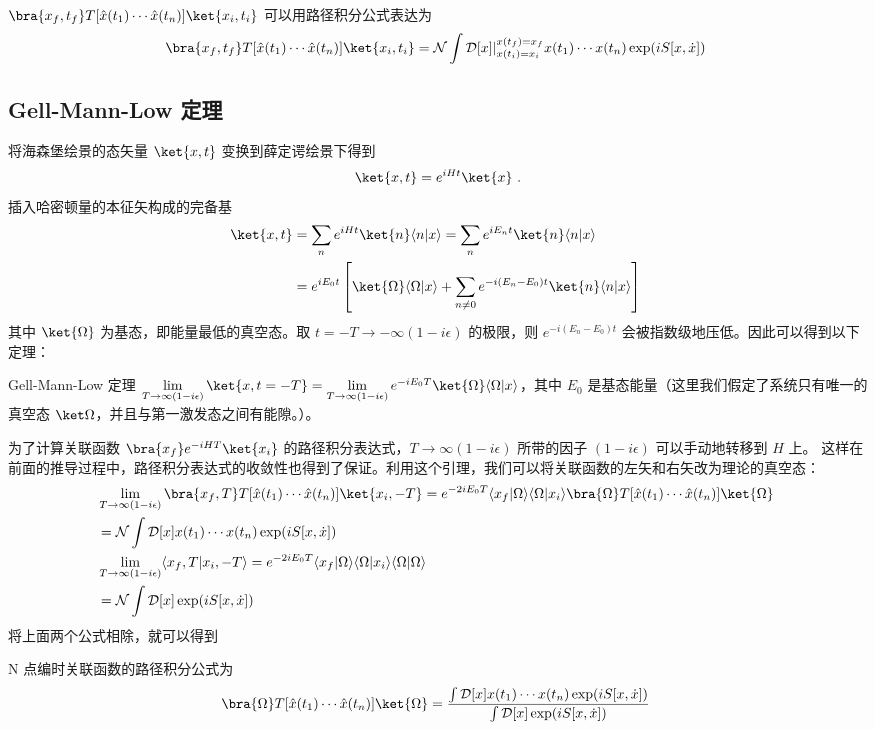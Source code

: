 \begin{theorem}{}
$\bra{x_f,t_f} T[\hat x(t_1)\cdots \hat x(t_n)]\ket{x_i,t_i}$ 可以用路径积分公式表达为
\begin{equation}
\begin{aligned}
        \bra{x_f,t_f} T[\hat x(t_1)\cdots \hat x(t_n)]\ket{x_i,t_i}=
        \mathcal{N}\int \mathcal{D}[x]|_{x(t_i)=x_i}^{x(t_f)=x_f} x(t_1)\cdots x(t_n) \exp(i S[x,\dot x])
\end{aligned}~
\end{equation}
\end{theorem}
\subsection{Gell-Mann-Low 定理}
将海森堡绘景的态矢量 $\ket{x,t}$ 变换到薛定谔绘景下得到
\begin{equation}
\ket{x,t}=e^{iHt}\ket{x}~.
\end{equation}
插入哈密顿量的本征矢构成的完备基
\begin{equation}
\begin{aligned}
\ket{x,t}&=\sum_n e^{iHt}\ket{n}\langle n|x\rangle=
\sum_n e^{iE_n t}\ket{n}\langle n|x\rangle\\
&=e^{iE_0t}\left[\ket{\Omega}\langle\Omega|x\rangle+\sum_{n\neq 0}e^{-i(E_n-E_0)t}\ket{n}\langle n|x\rangle\right]
\end{aligned}~
\end{equation}
其中 $\ket{\Omega}$ 为基态，即能量最低的真空态。取 $t=-T\rightarrow -\infty(1-i\epsilon)$ 的极限，则 $e^{-i(E_n-E_0) t}$ 会被指数级地压低。因此可以得到以下定理：
\begin{theorem}{Gell-Mann-Low 定理}
$\lim\limits_{T\rightarrow \infty(1-i\epsilon)}\ket{x,t=-T}=
    \lim\limits_{T\rightarrow \infty(1-i\epsilon)}
    e^{-iE_0T}\ket{\Omega}\langle \Omega|x\rangle$，其中 $E_0$ 是基态能量（这里我们假定了系统只有唯一的真空态 $\ket \Omega$，并且与第一激发态之间有能隙。）。
\end{theorem}
为了计算关联函数 $\bra{x_f}e^{-iHT}\ket{x_i}$ 的路径积分表达式，$T\rightarrow \infty(1-i\epsilon)$ 所带的因子 $(1-i\epsilon)$ 可以手动地转移到 $H$ 上。
这样在前面的推导过程中，路径积分表达式的收敛性也得到了保证。利用这个引理，我们可以将关联函数的左矢和右矢改为理论的真空态：
\begin{equation}
\begin{aligned}
&\lim\limits_{T\rightarrow \infty(1-i\epsilon)}
\bra{x_f,T} T[\hat x(t_1)\cdots \hat x(t_n)]\ket{x_i,-T}=
e^{-2iE_0T}\langle x_f | \Omega \rangle\langle\Omega|x_i\rangle\bra{\Omega} T[\hat x(t_1)\cdots \hat x(t_n)]\ket{\Omega}\\
&=\mathcal{N}\int \mathcal{D}[x] x(t_1)\cdots x(t_n) \exp(i S[x,\dot x])\\
&\lim\limits_{T\rightarrow \infty(1-i\epsilon)}
\langle x_f,T| x_i,-T\rangle=e^{-2iE_0T}\langle x_f | \Omega \rangle\langle\Omega|x_i\rangle\langle\Omega|\Omega\rangle\\
&=\mathcal{N}\int \mathcal{D}[x] \exp(i S[x,\dot x])
\end{aligned}~
\end{equation}
将上面两个公式相除，就可以得到
\begin{theorem}{}
N 点编时关联函数的路径积分公式为
\begin{equation}
\bra{\Omega} T[\hat x(t_1)\cdots \hat x(t_n)]\ket{\Omega}
=\frac{\int \mathcal{D}[x] x(t_1)\cdots x(t_n) \exp(i S[x,\dot x])}
{\int \mathcal{D}[x]\exp(i S[x,\dot x])}~
\end{equation}
\end{theorem}